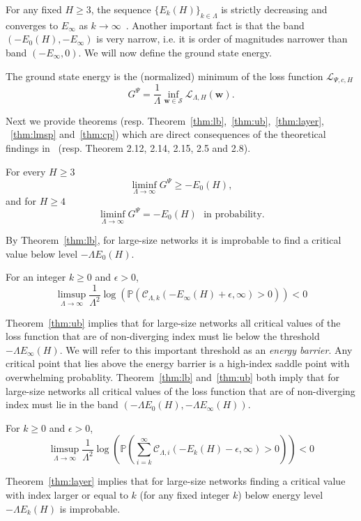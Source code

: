 \documentclass[twoside]{article}
\begin{document}
For any fixed $H \geq 3$, the sequence $\{E_k(H)\}_{k\in\mathbb{\Lambda}}$ is strictly decreasing and converges to $E_{\infty}$ as $k \rightarrow \infty$~\cite{AAC2010}. Another important fact is that the band $(-E_0(H),-E_{\infty})$ is very narrow, i.e. it is order of magnitudes narrower than band $(-E_{\infty},0)$. We will now define the ground state energy.

\begin{definition}
The ground state energy is the (normalized) minimum of the loss function $\mathcal{L}_{\Psi,c,H}$
\[G^\Psi = \frac{1}{\Lambda}\inf_{{\bm w}\in \mathcal{S}}\mathcal{L}_{\Lambda,H}({\bm w}).
\]
\end{definition}
Next we provide theorems (resp. Theorem~\ref{thm:lb},~\ref{thm:ub},~\ref{thm:layer}, ~\ref{thm:lmsp} and~\ref{thm:cp}) which are direct consequences of the theoretical findings in~\cite{AAC2010} (resp. Theorem 2.12, 2.14, 2.15, 2.5 and 2.8).  

\begin{theorem}
For every $H \geq 3$
\[\liminf_{\Lambda \rightarrow \infty} G^\Psi \geq -E_0(H),
\]
and for $H \geq 4$
\[\liminf_{\Lambda \rightarrow \infty} G^\Psi = -E_0(H) \:\:\:\text{in probability.}
\]
\label{thm:lb}
\end{theorem}
By Theorem~\ref{thm:lb}, for large-size networks it is improbable to find a critical value below level $-\Lambda E_0(H)$.
\begin{theorem}
For an integer $k \geq 0$ and $\epsilon > 0$,
\[\limsup_{\Lambda \rightarrow \infty} \frac{1}{\Lambda^2}\log(\mathbb{P}(\mathcal{C}_{\Lambda,k}(-E_{\infty}(H) + \epsilon,\infty)>0)) < 0
\]
\label{thm:ub}
\end{theorem}
Theorem~\ref{thm:ub} implies that for large-size networks all critical values of the loss function that are of non-diverging index must lie below the threshold $-\Lambda E_{\infty}(H)$. We will refer to this important threshold as an \textit{energy barrier}. Any critical point that lies above the energy barrier is a high-index saddle point with overwhelming probablity. Theorem~\ref{thm:lb} and~\ref{thm:ub} both imply that for large-size networks all critical values of the loss function that are of non-diverging index must lie in the band $\left(-\Lambda E_0(H),-\Lambda E_{\infty}(H)\right)$.
\begin{theorem}
For $k \geq 0$ and $\epsilon > 0$,
\[\limsup_{\Lambda \rightarrow \infty} \frac{1}{\Lambda^2}\log(\mathbb{P}(\sum_{i=k}^{\infty}\!\mathcal{C}_{\Lambda,i}(-E_k(H) - \epsilon,\infty) \!>\! 0)) \!<\! 0
\]
\label{thm:layer}
\end{theorem}
Theorem~\ref{thm:layer} implies that for large-size networks finding a critical value with index larger or equal to $k$ (for any fixed integer $k$) below energy level $-\Lambda E_k(H)$ is improbable. 
\end{document}
